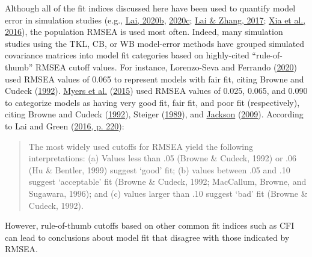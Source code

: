 \documentclass[11pt]{umnthesis}
\begin{document}
Although all of the fit indices discussed here have been used to quantify model error in simulation studies (e.g., \protect\hyperlink{ref-lai2020b}{Lai, 2020b}, \protect\hyperlink{ref-lai2020c}{2020c}; \protect\hyperlink{ref-lai2017}{Lai \& Zhang, 2017}; \protect\hyperlink{ref-xia2016a}{Xia et al., 2016}), the population RMSEA is used most often. Indeed, many simulation studies using the TKL, CB, or WB model-error methods have grouped simulated covariance matrices into model fit categories based on highly-cited ``rule-of-thumb'' RMSEA cutoff values. For instance, Lorenzo-Seva and Ferrando (\protect\hyperlink{ref-lorenzo-seva2020}{2020}) used RMSEA values of 0.065 to represent models with fair fit, citing Browne and Cudeck (\protect\hyperlink{ref-browne1992}{1992}). \protect\hyperlink{ref-myers2015a}{Myers et al.} (\protect\hyperlink{ref-myers2015a}{2015}) used RMSEA values of 0.025, 0.065, and 0.090 to categorize models as having very good fit, fair fit, and poor fit (respectively), citing Browne and Cudeck (\protect\hyperlink{ref-browne1992}{1992}), Steiger (\protect\hyperlink{ref-steiger1989ezpath}{1989}), and \protect\hyperlink{ref-jackson2009}{Jackson} (\protect\hyperlink{ref-jackson2009}{2009}). According to Lai and Green (\protect\hyperlink{ref-lai2016}{2016, p. 220}):

\begin{quote}
The most widely used cutoffs for RMSEA yield the following interpretations: (a) Values less than .05 (Browne \& Cudeck, 1992) or .06 (Hu \& Bentler, 1999) suggest `good' fit; (b) values between .05 and .10 suggest `acceptable' fit (Browne \& Cudeck, 1992; MacCallum, Browne, and Sugawara, 1996); and (c) values larger than .10 suggest `bad' fit (Browne \& Cudeck, 1992).
\end{quote}

\noindent However, rule-of-thumb cutoffs based on other common fit indices such as CFI can lead to conclusions about model fit that disagree with those indicated by RMSEA.
\end{document}
